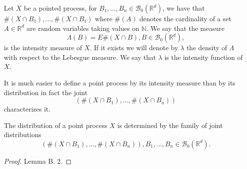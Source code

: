 \begin{defn} 
Let $X$ be a pointed process, for $B_1, ..., B_n\in\mathcal{B}_0(\mathbb{R}^d)$, we have that $\#(X\cap B_1), ..., \#(X\cap B_1)$ where $\#(A)$ denotes the cardinality of a set $A\in\mathbb{R}^d$ are random variables taking values on $\mathbb{N}$. 
We say that the measure $$\Lambda(B)=E \#(X\cap B), B\in\mathcal{B}_0(\mathbb{R}^d), $$ is the intensity measure of $X$. If it exists we will denote by $\lambda$ the density of $\Lambda$ with respect to the Lebesgue measure. We say that $\lambda$ is the intensity function of $X$.
 \end{defn}


It is much easier to define a point process by its intensity measure than by its distribution in fact the joint $$(\#(X\cap B_1), ..., \#(X\cap B_n))$$ characterizes it. 

\begin{prop} The distribution of a point process $X$ is determined by the family of joint distributions $$(\#(X\cap B_1), ..., \#(X\cap B_n)),B_1, ..., B_n\in\mathcal{B}_0(\mathbb{R}^d).$$
\end{prop}
\begin{proof}
\cite{Moller} Lemma B. 2.
\end{proof}



